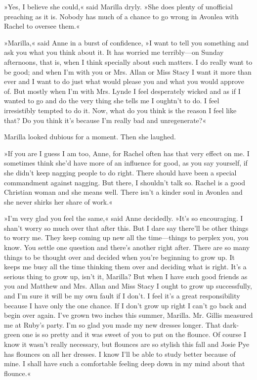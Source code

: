 »Yes, I believe she could,« said Marilla dryly. »She does plenty of unofficial preaching as it is. Nobody has much of a chance to go wrong in Avonlea with Rachel to oversee them.«

»Marilla,« said Anne in a burst of confidence, »I want to tell you something and ask you what you think about it. It has worried me terribly—on Sunday afternoons, that is, when I think specially about such matters. I do really want to be good; and when I’m with you or Mrs. Allan or Miss Stacy I want it more than ever and I want to do just what would please you and what you would approve of. But mostly when I’m with Mrs. Lynde I feel desperately wicked and as if I wanted to go and do the very thing she tells me I oughtn’t to do. I feel irresistibly tempted to do it. Now, what do you think is the reason I feel like that? Do you think it’s because I’m really bad and unregenerate?«

Marilla looked dubious for a moment. Then she laughed.

»If you are I guess I am too, Anne, for Rachel often has that very effect on me. I sometimes think she’d have more of an influence for good, as you say yourself, if she didn’t keep nagging people to do right. There should have been a special commandment against nagging. But there, I shouldn’t talk so. Rachel is a good Christian woman and she means well. There isn’t a kinder soul in Avonlea and she never shirks her share of work.«

»I’m very glad you feel the same,« said Anne decidedly. »It’s so encouraging. I shan’t worry so much over that after this. But I dare say there’ll be other things to worry me. They keep coming up new all the time—things to perplex you, you know. You settle one question and there’s another right after. There are so many things to be thought over and decided when you’re beginning to grow up. It keeps me busy all the time thinking them over and deciding what is right. It’s a serious thing to grow up, isn’t it, Marilla? But when I have such good friends as you and Matthew and Mrs. Allan and Miss Stacy I ought to grow up successfully, and I’m sure it will be my own fault if I don’t. I feel it’s a great responsibility because I have only the one chance. If I don’t grow up right I can’t go back and begin over again. I’ve grown two inches this summer, Marilla. Mr. Gillis measured me at Ruby’s party. I’m so glad you made my new dresses longer. That dark-green one is so pretty and it was sweet of you to put on the flounce. Of course I know it wasn’t really necessary, but flounces are so stylish this fall and Josie Pye has flounces on all her dresses. I know I’ll be able to study better because of mine. I shall have such a comfortable feeling deep down in my mind about that flounce.«

